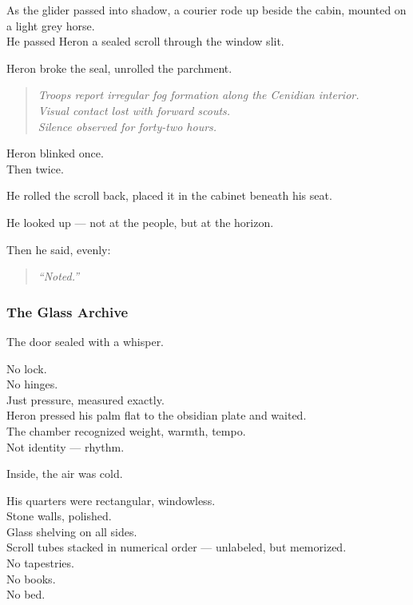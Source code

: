 \documentclass[12pt]{article}
\begin{document}
\vspace{1em}

As the glider passed into shadow, a courier rode up beside the cabin, mounted on a light grey horse.\\
He passed Heron a sealed scroll through the window slit.

Heron broke the seal, unrolled the parchment.

\begin{quote}
\textit{Troops report irregular fog formation along the Cenidian interior.\\
Visual contact lost with forward scouts.\\
Silence observed for forty-two hours.}
\end{quote}

Heron blinked once.\\
Then twice.

He rolled the scroll back, placed it in the cabinet beneath his seat.

He looked up — not at the people, but at the horizon.

Then he said, evenly:

\begin{quote}
\textit{“Noted.”}
\end{quote}

\dotfill

\subsubsection{The Glass Archive}

The door sealed with a whisper.

No lock.\\
No hinges.\\
Just pressure, measured exactly.\\
Heron pressed his palm flat to the obsidian plate and waited.\\
The chamber recognized weight, warmth, tempo.\\
Not identity — rhythm.

Inside, the air was cold.

\vspace{1em}

His quarters were rectangular, windowless.\\
Stone walls, polished.\\
Glass shelving on all sides.\\
Scroll tubes stacked in numerical order — unlabeled, but memorized.\\
No tapestries.\\
No books.\\
No bed.
\end{document}
